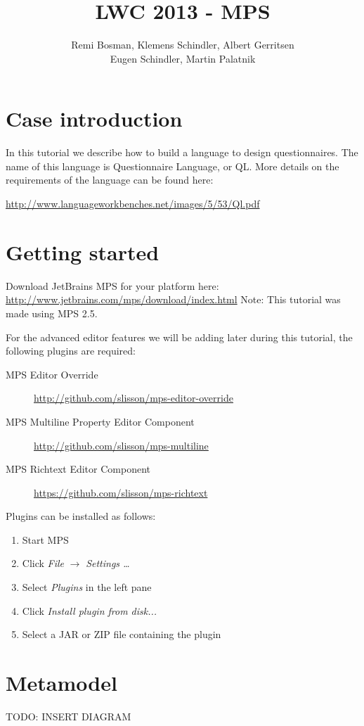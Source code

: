 \documentclass[11pt]{article}
\begin{document}
\title{LWC 2013 - MPS}
\author{Remi Bosman, Klemens Schindler, Albert Gerritsen\\
Eugen Schindler, Martin Palatnik}

\maketitle

\section{Case introduction}
In this tutorial we describe how to build a language to design questionnaires.
The name of this language is Questionnaire Language, or QL.
More details on the requirements of the language can be found here:

\url{http://www.languageworkbenches.net/images/5/53/Ql.pdf}

\section{Getting started}
Download JetBrains MPS for your platform here:
\url{http://www.jetbrains.com/mps/download/index.html}
Note: This tutorial was made using MPS 2.5.

For the advanced editor features we will be adding later during this tutorial, the following plugins are required:
\begin{description}
\item[MPS Editor Override] \url{http://github.com/slisson/mps-editor-override}
\item[MPS Multiline Property Editor Component] \url{http://github.com/slisson/mps-multiline}
\item[MPS Richtext Editor Component] \url{https://github.com/slisson/mps-richtext}
\end{description}

Plugins can be installed as follows:
\begin{enumerate}
\item Start MPS
\item Click \textit{File} $\rightarrow$ \textit{Settings \ldots}
\item Select \textit{Plugins} in the left pane
\item Click \textit{Install plugin from disk...}
\item Select a JAR or ZIP file containing the plugin
\end{enumerate}

\section{Metamodel}
TODO: INSERT DIAGRAM
\end{document}
